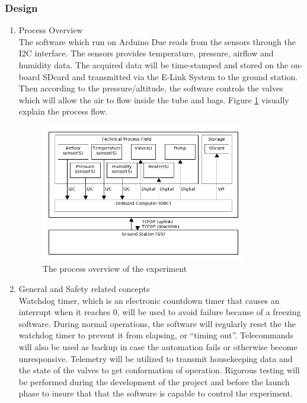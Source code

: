 \documentclass[a4paper,12pt,twoside]{article}
\begin{document}
\subsubsection{Design}
\begin{enumerate}[label=(\alph*)]
\item{Process Overview}\\
The software which run on Arduino Due reads from the sensors through the I2C interface. The sensors provides temperature, pressure, airflow and humidity data. The acquired data will be time-stamped and stored on the on-board SDcard and transmitted via the E-Link System to the ground station. Then according to the pressure/altitude, the software controls the valves which will allow the air to flow inside the tube and bags. Figure \ref{processOverview} visually explain the process flow.
\begin{figure}[H]
    \centering
    \includegraphics[width=0.85\textwidth]{4-experiment-design/img/Process-overview-V0-1.png}
    \caption{The process overview of the experiment}
    \label{processOverview}
\end{figure}
\item{General and Safety related concepts}\\
Watchdog timer, which is an electronic countdown timer that causes an interrupt when it reaches 0, will be used to avoid failure because of a freezing software. During normal operations, the software will regularly reset the the watchdog timer to prevent it from elapsing, or \enquote{timing out}. Telecommands will also be used as backup in case the automation fails or otherwise become unresponsive. Telemetry will be utilized to transmit housekeeping data and the state of the valves to get conformation of operation. Rigorous testing will be performed during the development of the project and before the launch phase to insure that that the software is capable to control the experiment.\\

\end{enumerate}
\end{document}
